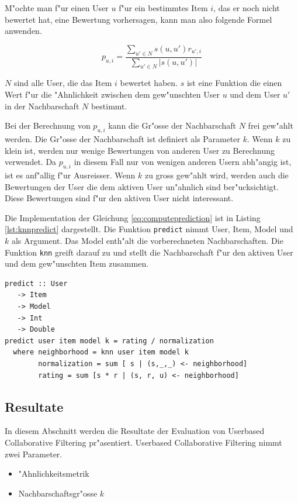 \documentclass[a4paper, 12pt]{article}
\begin{document}
M"ochte man f"ur einen User $u$ f"ur ein bestimmtes Item $i$, das er noch nicht bewertet hat, eine Bewertung vorhersagen, kann man also folgende Formel anwenden.

\begin{equation}
  \label{eq:computeprediction}
  p_{u,i} = \frac{\sum_{u' \in N}{s(u,u') r_{u',i}}}{\sum_{u' \in N}{|s(u,u')|}}
\end{equation}

$N$ sind alle User, die das Item $i$ bewertet haben. $s$ ist eine Funktion die einen Wert f"ur die "Ahnlichkeit zwischen dem gew"unschten User $u$ und dem User $u'$ in der Nachbarschaft $N$ bestimmt.

Bei der Berechnung von $p_{u,i}$ kann die Gr"osse der Nachbarschaft $N$ frei gew"ahlt werden. Die Gr"osse der Nachbarschaft ist definiert als Parameter $k$. Wenn $k$ zu klein ist, werden nur wenige Bewertungen von anderen User zu Berechnung verwendet. Da $p_{u,i}$ in diesem Fall nur von wenigen anderen Usern abh"angig ist, ist es anf"allig f"ur Ausreisser. Wenn $k$ zu gross gew"ahlt wird, werden auch die Bewertungen der User die dem aktiven User un"ahnlich sind ber"ucksichtigt. Diese Bewertungen sind f"ur den aktiven User nicht interessant. 

Die Implementation der Gleichung \ref{eq:computeprediction} ist in Listing \ref{lst:knnpredict} dargestellt. Die Funktion \verb|predict| nimmt User, Item, Model und $k$ als Argument. Das Model enth"alt die vorberechneten Nachbarschaften. Die Funktion \verb|knn| greift darauf zu und stellt die Nachbarschaft f"ur den aktiven User und dem gew"unschten Item zusammen.

\begin{lstlisting}[caption=Berechnung von $p_{u,i}$, label=lst:knnpredict]
  predict :: User
   -> Item
   -> Model
   -> Int
   -> Double
predict user item model k = rating / normalization
  where neighborhood = knn user item model k
        normalization = sum [ s | (s,_,_) <- neighborhood]
        rating = sum [s * r | (s, r, u) <- neighborhood]
\end{lstlisting}

\subsection{Resultate}
\label{sec:userbasedresults}

In diesem Abschnitt werden die Resultate der Evaluation von Userbased Collaborative Filtering pr"asentiert. Userbased Collaborative Filtering nimmt zwei Parameter.
\begin{itemize}
\item "Ahnlichkeitsmetrik
\item Nachbarschaftsgr"osse $k$
\end{itemize}
\end{document}
